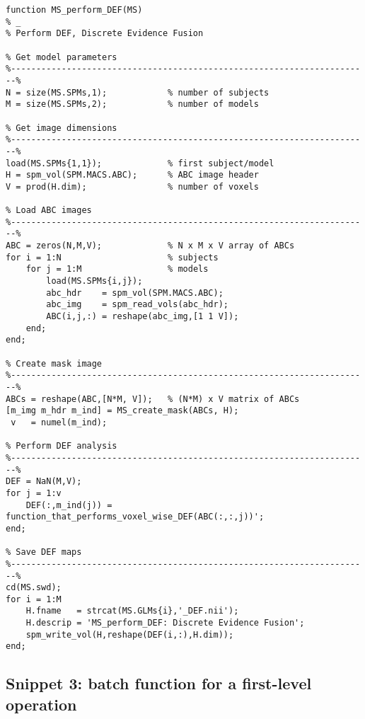 \documentclass[a4paper,12pt]{article}
\begin{document}
\vspace{1em}
\begin{verbatim}
function MS_perform_DEF(MS)
% _
% Perform DEF, Discrete Evidence Fusion

% Get model parameters
%-----------------------------------------------------------------------%
N = size(MS.SPMs,1);            % number of subjects
M = size(MS.SPMs,2);            % number of models

% Get image dimensions
%-----------------------------------------------------------------------%
load(MS.SPMs{1,1});             % first subject/model
H = spm_vol(SPM.MACS.ABC);      % ABC image header
V = prod(H.dim);                % number of voxels

% Load ABC images
%-----------------------------------------------------------------------%
ABC = zeros(N,M,V);             % N x M x V array of ABCs
for i = 1:N                     % subjects
    for j = 1:M                 % models
        load(MS.SPMs{i,j});
        abc_hdr    = spm_vol(SPM.MACS.ABC);
        abc_img    = spm_read_vols(abc_hdr);
        ABC(i,j,:) = reshape(abc_img,[1 1 V]);
    end;
end;

% Create mask image
%-----------------------------------------------------------------------%
ABCs = reshape(ABC,[N*M, V]);   % (N*M) x V matrix of ABCs
[m_img m_hdr m_ind] = MS_create_mask(ABCs, H);
 v   = numel(m_ind);

% Perform DEF analysis
%-----------------------------------------------------------------------%
DEF = NaN(M,V);
for j = 1:v
    DEF(:,m_ind(j)) = function_that_performs_voxel_wise_DEF(ABC(:,:,j))';
end;

% Save DEF maps
%-----------------------------------------------------------------------%
cd(MS.swd);
for i = 1:M
    H.fname   = strcat(MS.GLMs{i},'_DEF.nii');
    H.descrip = 'MS_perform_DEF: Discrete Evidence Fusion';
    spm_write_vol(H,reshape(DEF(i,:),H.dim));
end;
\end{verbatim}


\pagebreak
\subsection*{Snippet 3: batch function for a first-level operation} \label{sec:ABC-batch}
\end{document}
